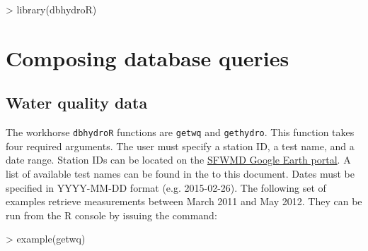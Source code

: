 \documentclass[12pt,notitlepage]{article}
\begin{document}
\begin{Schunk}
\begin{Sinput}
> library(dbhydroR)
\end{Sinput}
\end{Schunk}



\section{Composing database queries}
\subsection{Water quality data}

The workhorse \texttt{dbhydroR} functions are \verb|getwq| and \texttt{gethydro}. This function takes four required arguments. The user must specify a station ID, a test name, and a date range. Station IDs can be located on the \href{http://my.sfwmd.gov/KMLEXT/CUSTOMKMLS/DBHydro/DBHydroKML/DBHYDRO_KML.kmz}{SFWMD Google Earth portal}. A list of available test names can be found in the  to this document. Dates must be specified in YYYY-MM-DD format (e.g. 2015-02-26).   The following set of examples retrieve measurements between March 2011 and May 2012. They can be run from the R console by issuing the command:

\begin{Schunk}
\begin{Sinput}
> example(getwq)
\end{Sinput}
\end{Schunk}
\end{document}
